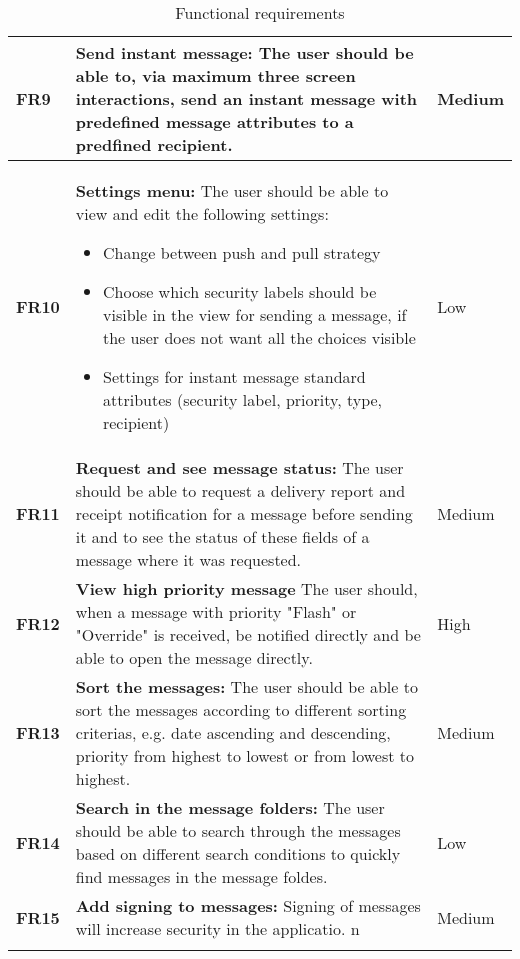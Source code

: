 \begin{longtable}{>{\setlength\hsize{.3\hsize}}X|>{\setlength\hsize{0.9\hsize}}X|>{\setlength\hsize{.3\hsize}}X}
\textbf{FR9} & \textbf{Send instant message:} The user should be able to, via maximum three screen interactions, send an instant message with predefined message attributes to a predfined recipient. & Medium \\ \hline

\textbf{FR10} & \textbf{Settings menu:} The user should be able to view and edit the following settings:
\begin{itemize}
\item{}Change between push and pull strategy
\item{}Choose which security labels should be visible in the view for sending a message, if the user does not want all the choices visible
\item{}Settings for instant message standard attributes (security label, priority, type, recipient)
\end{itemize}  & Low \\ \hline

\textbf{FR11} & \textbf{Request and see message status:} The user should be able to request a delivery report and receipt notification for a message before sending it and to see the status of these fields of a message where it was requested. & Medium \\ \hline

\textbf{FR12} & \textbf{View high priority message} The user should, when a message with priority "Flash" or "Override" is received, be notified directly and be able to open the message directly. & High \\ \hline

\textbf{FR13} & \textbf{Sort the messages:} The user should be able to sort the messages according to different sorting criterias, e.g. date ascending and descending, priority from highest to lowest or from lowest to highest. & Medium \\ \hline

\textbf{FR14} & \textbf{Search in the message folders:} The user should be able to search through the messages based on different search conditions to quickly find messages in the message foldes. & Low \\ \hline

\textbf{FR15} & \textbf{Add signing to messages:} Signing of messages will increase security in the applicatio. n & Medium \\ \hline

\caption{Functional requirements} \label{tab:functionalrequirements}
\end{longtable}